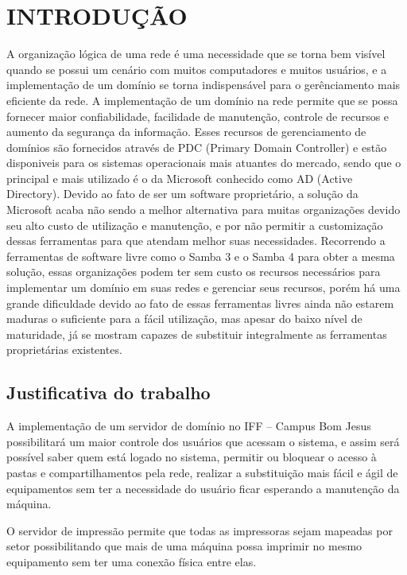 \chapter{INTRODUÇÃO}

A organização lógica de uma rede é uma necessidade que se torna bem visível quando se possui um cenário com muitos computadores e muitos usuários, e a implementação de um domínio se torna indispensável para o gerênciamento mais eficiente da rede. A implementação de um domínio na rede permite que se possa fornecer maior confiabilidade, facilidade de manutenção, controle de recursos e aumento da segurança da informação.
Esses recursos de gerenciamento de domínios são fornecidos através de PDC (Primary Domain Controller) e estão disponiveis para os sistemas operacionais mais atuantes do mercado, sendo que o principal e mais utilizado é o da Microsoft conhecido como AD (Active Directory).
Devido ao fato de ser um software proprietário, a solução da Microsoft acaba não sendo a melhor alternativa para muitas organizações devido seu alto custo de utilização e manutenção, e por não permitir a customização dessas ferramentas para que atendam melhor suas necessidades.
Recorrendo a ferramentas de software livre como o Samba 3 e o Samba 4 para obter a mesma solução, essas organizações podem ter sem custo os recursos necessários para implementar um domínio em suas redes e gerenciar seus recursos, porém há uma grande dificuldade devido ao fato de essas ferramentas livres ainda não estarem maduras o suficiente para a fácil utilização, mas apesar do baixo nível de maturidade, já se mostram capazes de substituir integralmente as ferramentas proprietárias existentes.

\section{Justificativa do trabalho}

A implementação de um servidor de domínio no IFF – Campus Bom Jesus possibilitará um maior controle dos usuários que acessam o sistema, e assim será possível saber quem está logado no sistema, permitir ou bloquear o acesso à pastas e compartilhamentos pela rede, realizar a substituição mais fácil e ágil de equipamentos sem ter a necessidade do usuário ficar esperando a manutenção da máquina.

O servidor de impressão permite que todas as impressoras sejam mapeadas por setor possibilitando que mais de uma máquina possa imprimir no mesmo equipamento sem ter uma conexão física entre elas.

